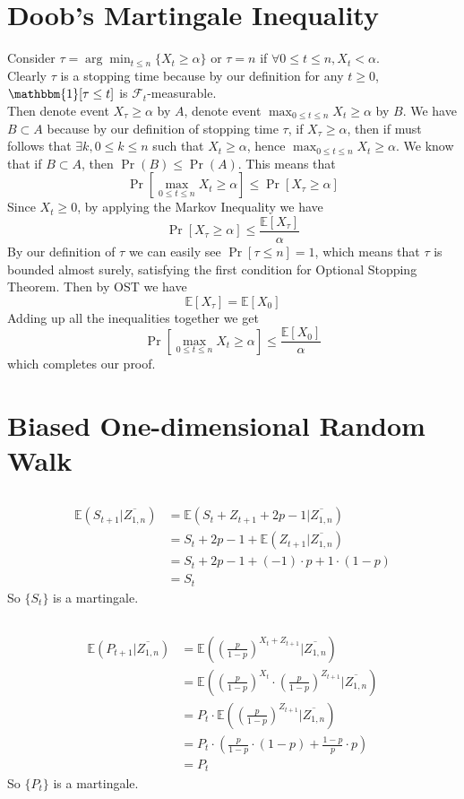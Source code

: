 \documentclass[12pt,letterpaper]{article}
\begin{document}
\section{Doob's Martingale Inequality}
Consider $\tau=\arg\min_{t\leq n}\{X_t\geq\alpha\}$ or $\tau=n$ if $\forall 0\leq t\leq n, X_t<\alpha$.\\
Clearly $\tau$ is a stopping time because by our definition 
for any $t\geq 0$, $\mathbbm{1}[\tau\leq t]$ is $\mathcal{F}_t$-measurable.\\
Then denote event $X_{\tau}\geq\alpha$ by $A$,
denote event $\max_{0\leq t\leq n}X_t\geq\alpha$ by $B$.
We have $B\subset A$ because by our definition of stopping time $\tau$,
if $X_{\tau}\geq\alpha$,
then if must follows that $\exists k, 0\leq k\leq n$ such that $X_t\geq\alpha$,
hence $\max_{0\leq t\leq n}X_t\geq\alpha$.
We know that if $B\subset A$, then $\Pr(B)\leq\Pr(A)$.
This means that
$$\Pr \left[\max_{0\leq t\leq n}X_t\geq\alpha\right]\leq \Pr\left[X_{\tau}\geq\alpha\right]$$
Since $X_t\geq 0$, by applying the Markov Inequality we have
$$\Pr\left[X_{\tau}\geq\alpha\right]\leq \frac{\mathbb{E}\left[X_{\tau}\right]}{\alpha}$$
By our definition of $\tau$ we can easily see $\Pr[\tau\leq n]=1$,
which means that $\tau$ is bounded almost surely,
satisfying the first condition for Optional Stopping Theorem.
Then by OST we have
$$\mathbb{E}[X_{\tau}]=\mathbb{E}[{X_0}]$$
Adding up all the inequalities together we get 
$$\Pr \left[\max_{0\leq t\leq n}X_t\geq\alpha\right]\leq \frac{\mathbb{E}\left[X_{0}\right]}{\alpha}$$
which completes our proof.

\section{Biased One-dimensional Random Walk}
\subsection{}
\begin{align}
  \mathbb{E}(S_{t+1}|\overline{Z_{1,n}})
  &=\mathbb{E}(S_t+Z_{t+1}+2p-1|\overline{Z_{1,n}})\\
  &=S_t+2p-1+\mathbb{E}(Z_{t+1}|\overline{Z_{1,n}})\\
  &=S_t+2p-1+(-1)\cdot p+1\cdot(1-p)\\
  &=S_t
\end{align}
So $\{S_t\}$ is a martingale.
\subsection{}
\begin{align}
  \mathbb{E}(P_{t+1}|\overline{Z_{1,n}})
  &=\mathbb{E}((\frac{p}{1-p})^{X_t+Z_{t+1}}|\overline{Z_{1,n}})\\
  &=\mathbb{E}((\frac{p}{1-p})^{X_t}\cdot(\frac{p}{1-p})^{Z_{t+1}}|\overline{Z_{1,n}})\\
  &=P_t\cdot\mathbb{E}((\frac{p}{1-p})^{Z_{t+1}}|\overline{Z_{1,n}})\\
  &=P_t\cdot(\frac{p}{1-p}\cdot(1-p)+\frac{1-p}{p}\cdot p)\\
  &=P_t
\end{align}
So $\{P_t\}$ is a martingale.
\end{document}
